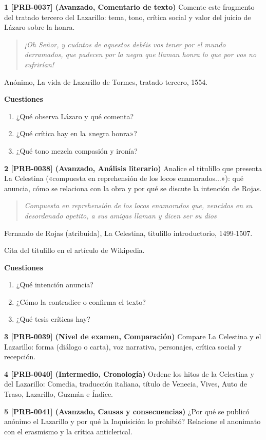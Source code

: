 \documentclass{book}
\begin{document}
\begin{tcolorbox}[title={Ejercicios}, studiumworked, breakable]

\noindent\textbf{1 [PRB-0037] (Avanzado, Comentario de texto)}
Comente este fragmento del tratado tercero del Lazarillo: tema, tono, crítica social y valor del juicio de Lázaro sobre la honra.


\begin{quote}
\itshape ¡Oh Señor, y cuántos de aquestos debéis vos tener por el mundo derramados, que padecen por la negra que llaman honra lo que por vos no sufrirían!
\end{quote}
{\noindent\footnotesize Anónimo, La vida de Lazarillo de Tormes, tratado tercero, 1554.\par}

\noindent\textbf{Cuestiones}
\begin{enumerate}
\item ¿Qué observa Lázaro y qué comenta?
\item ¿Qué crítica hay en la «negra honra»?
\item ¿Qué tono mezcla compasión y ironía?
\end{enumerate}

\noindent\textbf{2 [PRB-0038] (Avanzado, Análisis literario)}
Analice el titulillo que presenta La Celestina («compuesta en reprehensión de los locos enamorados...»): qué anuncia, cómo se relaciona con la obra y por qué se discute la intención de Rojas.


\begin{quote}
\itshape Compuesta en reprehensión de los locos enamorados que, vencidos en su desordenado apetito, a sus amigas llaman y dicen ser su dios
\end{quote}
{\noindent\footnotesize Fernando de Rojas (atribuida), La Celestina, titulillo introductorio, 1499-1507.\par}
{\noindent\footnotesize Cita del titulillo en el artículo de Wikipedia.\par}

\noindent\textbf{Cuestiones}
\begin{enumerate}
\item ¿Qué intención anuncia?
\item ¿Cómo la contradice o confirma el texto?
\item ¿Qué tesis críticas hay?
\end{enumerate}

\noindent\textbf{3 [PRB-0039] (Nivel de examen, Comparación)}
Compare La Celestina y el Lazarillo: forma (diálogo o carta), voz narrativa, personajes, crítica social y recepción.


\noindent\textbf{4 [PRB-0040] (Intermedio, Cronología)}
Ordene los hitos de la Celestina y del Lazarillo: Comedia, traducción italiana, título de Venecia, Vives, Auto de Traso, Lazarillo, Guzmán e Índice.


\noindent\textbf{5 [PRB-0041] (Avanzado, Causas y consecuencias)}
¿Por qué se publicó anónimo el Lazarillo y por qué la Inquisición lo prohibió? Relacione el anonimato con el erasmismo y la crítica anticlerical.

\end{tcolorbox}
\end{document}
